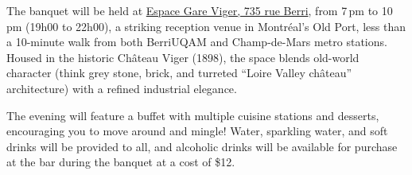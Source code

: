 The banquet will be held at \href{https://maps.app.goo.gl/Hh75s2zGi3QP911q9}{Espace Gare Viger, 735 rue Berri}, from 7\,pm to 10\,pm (19h00 to 22h00), a striking reception venue in Montréal's Old Port, less than a 10-minute walk from both Berri\textendash UQAM and Champ-de-Mars metro stations. Housed in the historic Château Viger (1898), the space blends old-world character (think grey stone, brick, and turreted ``Loire Valley château'' architecture) with a refined industrial elegance.

The evening will feature a buffet with multiple cuisine stations and desserts, encouraging you to move around and mingle! Water, sparkling water, and soft drinks will be provided to all, and alcoholic drinks will be available for purchase at the bar during the banquet at a cost of \$12.

